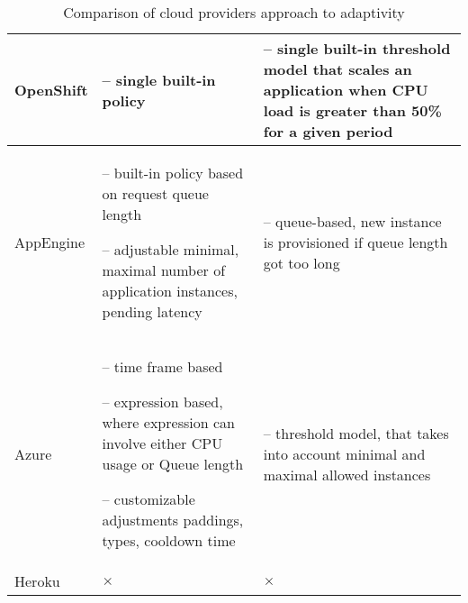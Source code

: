 \begin{table}[!htbp]
\begin{tabularx}{\textwidth}[]{ X  X X }
OpenShift & 
-- single built-in policy

 &
-- single built-in threshold model that scales an application when CPU load is greater than 50\% for a given period
\\ \hline

AppEngine & 

-- built-in policy based on request queue length

-- adjustable minimal, maximal number of application instances, pending latency

 &
-- queue-based, new instance is provisioned if queue length got too long 
  \\ \hline

Azure & 
-- time frame based

-- expression based, where expression can involve either CPU usage or Queue length

-- customizable adjustments paddings, types, cooldown time
&
-- threshold model, that takes into account minimal and maximal allowed instances
 \\ \hline

Heroku & $\times$ & $\times$ \\ \hline
\end{tabularx}

\caption{Comparison of cloud providers approach to adaptivity}
\label{tab:cloud-providers-adaptivity}

\end{table}

